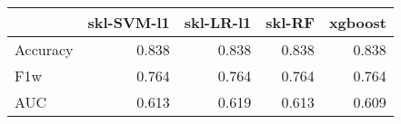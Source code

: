 \begin{tabular}{lrrrr}
\toprule
{} &  skl-SVM-l1 &  skl-LR-l1 &  skl-RF &  xgboost \\
\midrule
Accuracy &       0.838 &      0.838 &   0.838 &    0.838 \\
F1w      &       0.764 &      0.764 &   0.764 &    0.764 \\
AUC      &       0.613 &      0.619 &   0.613 &    0.609 \\
\bottomrule
\end{tabular}
